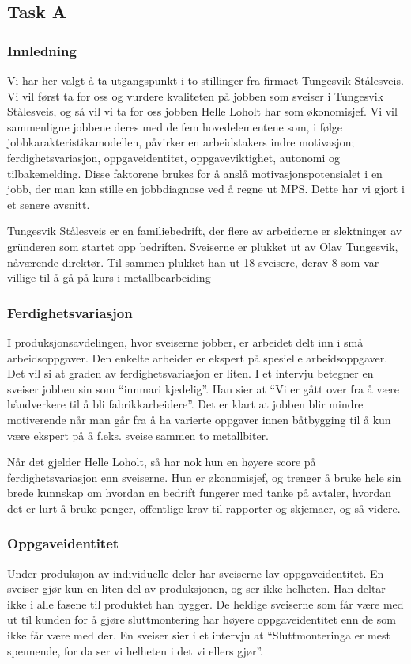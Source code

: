 

\subsection{Task A}
\subsubsection{Innledning}
Vi har her valgt å ta utgangspunkt i to stillinger fra firmaet Tungesvik Stålesveis. Vi vil først ta for oss og vurdere kvaliteten på jobben som sveiser i Tungesvik Stålesveis, og så vil vi ta for oss jobben Helle Loholt har som økonomisjef. Vi vil sammenligne jobbene deres med de fem hovedelementene som, i følge jobbkarakteristikamodellen, påvirker en arbeidstakers indre motivasjon; ferdighetsvariasjon, oppgaveidentitet, oppgaveviktighet, autonomi og tilbakemelding. Disse faktorene brukes for å anslå motivasjonspotensialet i en jobb, der man kan stille en jobbdiagnose ved å regne ut MPS. Dette har vi gjort i et senere avsnitt.

Tungesvik Stålesveis er en familiebedrift, der flere av arbeiderne er slektninger av gründeren som startet opp bedriften. Sveiserne er plukket ut av Olav Tungesvik, nåværende direktør. Til sammen plukket han ut 18 sveisere, derav 8 som var villige til å gå på kurs i metallbearbeiding

\subsubsection{Ferdighetsvariasjon}
I produksjonsavdelingen, hvor sveiserne jobber, er arbeidet delt inn i små arbeidsoppgaver. Den enkelte arbeider er ekspert på spesielle arbeidsoppgaver. Det vil si at graden av ferdighetsvariasjon er liten. I et intervju betegner en sveiser jobben sin som “innmari kjedelig”. Han sier at “Vi er gått over fra å være håndverkere til å bli fabrikkarbeidere”. Det er klart at jobben blir mindre motiverende når man går fra å ha varierte oppgaver innen båtbygging til å kun være ekspert på å f.eks. sveise sammen to metallbiter.

Når det gjelder Helle Loholt, så har nok hun en høyere score på ferdighetsvariasjon enn sveiserne. Hun er økonomisjef, og trenger å bruke hele sin brede kunnskap om hvordan en bedrift fungerer med tanke på avtaler, hvordan det er lurt å bruke penger, offentlige krav til rapporter og skjemaer, og så videre.

\subsubsection{Oppgaveidentitet}
Under produksjon av individuelle deler har sveiserne lav oppgaveidentitet. En sveiser gjør kun en liten del av produksjonen, og ser ikke helheten. Han deltar ikke i alle fasene til produktet han bygger. De heldige sveiserne som får være med ut til kunden for å gjøre sluttmontering har høyere oppgaveidentitet enn de som ikke får være med der. En sveiser sier i et intervju at “Sluttmonteringa er mest spennende, for da ser vi helheten i det vi ellers gjør”.

